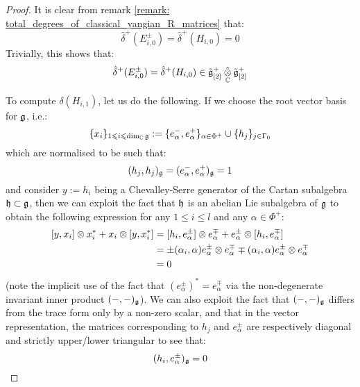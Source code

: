                 \begin{proof}
                    It is clear from remark \ref{remark: total_degrees_of_classical_yangian_R_matrices} that:
                        $$\hat{\delta}^+(E_{i, 0}^{\pm}) = \hat{\delta}^+(H_{i, 0}) = 0$$
                    Trivially, this shows that:
                        $$\hat{\delta}^+(E_{i, 0}^{\pm}) = \hat{\delta}^+(H_{i, 0}) \in \tilde{\g}_{[2]}^+ \hattensor_{\bbC} \tilde{\g}_{[2]}^+$$
                
                    To compute $\delta(H_{i, 1})$, let us do the following. If we choose the root vector basis for $\mathfrak{g}$, i.e.:
                        $$\{x_i\}_{1 \leqslant i \leqslant \dim_{\mathbb{C}} \mathfrak{g}} := \{e_{\alpha}^-, e_{\alpha}^+\}_{\alpha \in \Phi^+} \cup \{h_j\}_{j \in \Gamma_0}$$
                    which are normalised to be such that:
                        $$(h_j, h_j)_{\mathfrak{g}} = (e_{\alpha}^-, e_{\alpha}^+)_{\mathfrak{g}} = 1$$
                    and consider $y := h_i$ being a Chevalley-Serre generator of the Cartan subalgebra $\mathfrak{h} \subset \mathfrak{g}$, then we can exploit the fact that $\mathfrak{h}$ is an abelian Lie subalgebra of $\mathfrak{g}$ to obtain the following expression for any $1 \leq i \leq l$ and any $\alpha \in \Phi^+$:
                        $$
                            \begin{aligned}
                                [y, x_i] \tensor x_i^* + x_i \tensor [y, x_i^*] & = [h_i, e_{\alpha}^{\pm}] \tensor e_{\alpha}^{\mp} + e_{\alpha}^{\pm} \tensor [h_i, e_{\alpha}^{\mp}]
                                \\
                                & = \pm (\alpha_i, \alpha) e_{\alpha}^{\pm} \tensor e_{\alpha}^{\mp} \mp (\alpha_i, \alpha) e_{\alpha}^{\pm} \tensor e_{\alpha}^{\mp}
                                \\
                                & = 0
                            \end{aligned}
                        $$
                    (note the implicit use of the fact that $(e_{\alpha}^{\pm})^* = e_{\alpha}^{\mp}$ via the non-degenerate invariant inner product $(-, -)_{\mathfrak{g}}$). We can also exploit the fact that $(-, -)_{\mathfrak{g}}$ differs from the trace form only by a non-zero scalar, and that in the vector representation, the matrices corresponding to $h_j$ and $e_{\alpha}^{\pm}$ are respectively diagonal and strictly upper/lower triangular to see that:
                        $$(h_i, e_{\alpha}^{\pm})_{\mathfrak{g}} = 0$$


\end{proof}
